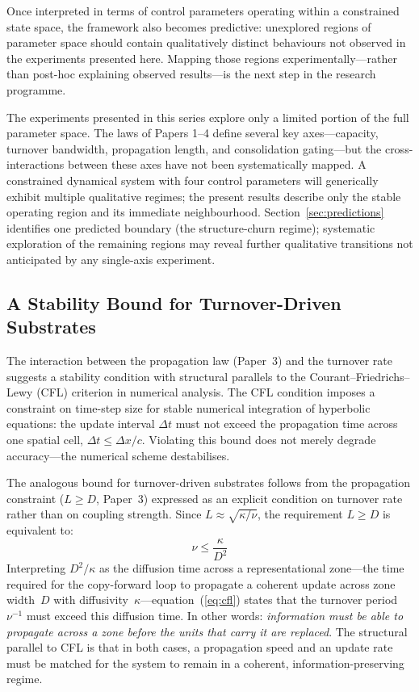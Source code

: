 \documentclass[11pt]{article}
\begin{document}
Once interpreted in terms of control parameters operating within a constrained state space, the framework also becomes predictive: unexplored regions of parameter space should contain qualitatively distinct behaviours not observed in the experiments presented here. Mapping those regions experimentally---rather than post-hoc explaining observed results---is the next step in the research programme.

The experiments presented in this series explore only a limited portion of the full parameter space. The laws of Papers 1--4 define several key axes---capacity, turnover bandwidth, propagation length, and consolidation gating---but the cross-interactions between these axes have not been systematically mapped. A constrained dynamical system with four control parameters will generically exhibit multiple qualitative regimes; the present results describe only the stable operating region and its immediate neighbourhood. Section~\ref{sec:predictions} identifies one predicted boundary (the structure-churn regime); systematic exploration of the remaining regions may reveal further qualitative transitions not anticipated by any single-axis experiment.

\subsection{A Stability Bound for Turnover-Driven Substrates}
\label{sec:cfl}

The interaction between the propagation law (Paper~3) and the turnover rate suggests a stability condition with structural parallels to the Courant--Friedrichs--Lewy (CFL) criterion in numerical analysis.
The CFL condition imposes a constraint on time-step size for stable numerical integration of hyperbolic equations: the update interval $\Delta t$ must not exceed the propagation time across one spatial cell, $\Delta t \leq \Delta x / c$.
Violating this bound does not merely degrade accuracy---the numerical scheme destabilises.

The analogous bound for turnover-driven substrates follows from the propagation constraint ($L \geq D$, Paper~3) expressed as an explicit condition on turnover rate rather than on coupling strength.
Since $L \approx \sqrt{\kappa/\nu}$, the requirement $L \geq D$ is equivalent to:
\begin{equation}
  \nu \leq \frac{\kappa}{D^2}
  \label{eq:cfl}
\end{equation}
Interpreting $D^2/\kappa$ as the diffusion time across a representational zone---the time required for the copy-forward loop to propagate a coherent update across zone width~$D$ with diffusivity~$\kappa$---equation~(\ref{eq:cfl}) states that the turnover period~$\nu^{-1}$ must exceed this diffusion time.
In other words: \emph{information must be able to propagate across a zone before the units that carry it are replaced}.
The structural parallel to CFL is that in both cases, a propagation speed and an update rate must be matched for the system to remain in a coherent, information-preserving regime.
\end{document}
